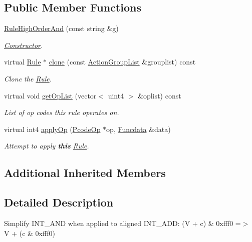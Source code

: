 \subsection*{Public Member Functions}
\begin{DoxyCompactItemize}
\item 
\mbox{\hyperlink{class_rule_high_order_and_adb62e27eedfa99a05c22cc4f62a9becf}{Rule\+High\+Order\+And}} (const string \&g)
\begin{DoxyCompactList}\small\item\em \mbox{\hyperlink{class_constructor}{Constructor}}. \end{DoxyCompactList}\item 
virtual \mbox{\hyperlink{class_rule}{Rule}} $\ast$ \mbox{\hyperlink{class_rule_high_order_and_a467fae8c3fcb0944360aa286fa7a44e9}{clone}} (const \mbox{\hyperlink{class_action_group_list}{Action\+Group\+List}} \&grouplist) const
\begin{DoxyCompactList}\small\item\em Clone the \mbox{\hyperlink{class_rule}{Rule}}. \end{DoxyCompactList}\item 
virtual void \mbox{\hyperlink{class_rule_high_order_and_ad60f9bfb0431ed033b082891756d8a12}{get\+Op\+List}} (vector$<$ uint4 $>$ \&oplist) const
\begin{DoxyCompactList}\small\item\em List of op codes this rule operates on. \end{DoxyCompactList}\item 
virtual int4 \mbox{\hyperlink{class_rule_high_order_and_acadd25bbb252e1619bf2acc6d3b89e2e}{apply\+Op}} (\mbox{\hyperlink{class_pcode_op}{Pcode\+Op}} $\ast$op, \mbox{\hyperlink{class_funcdata}{Funcdata}} \&data)
\begin{DoxyCompactList}\small\item\em Attempt to apply {\bfseries{this}} \mbox{\hyperlink{class_rule}{Rule}}. \end{DoxyCompactList}\end{DoxyCompactItemize}
\subsection*{Additional Inherited Members}


\subsection{Detailed Description}
Simplify I\+N\+T\+\_\+\+A\+ND when applied to aligned I\+N\+T\+\_\+\+A\+DD\+: {\ttfamily (V + c) \& 0xfff0 =$>$ V + (c \& 0xfff0)} 

